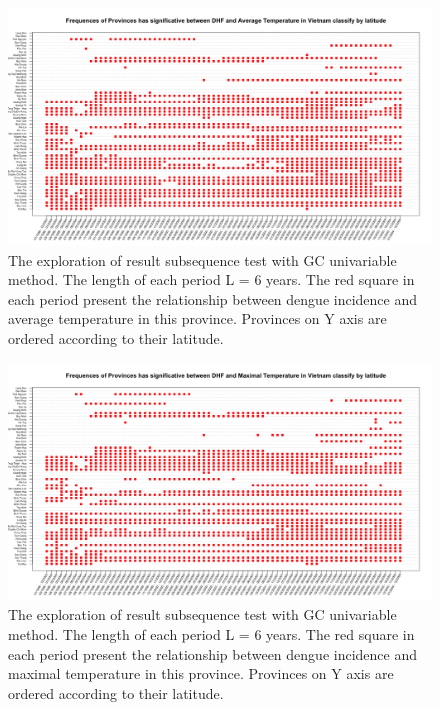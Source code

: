 

\begin{figure}[h]
\begin{center}
\includegraphics[width = \linewidth]{../figures/annexe/lat_result_ta.png}
\caption{The exploration of result subsequence test with GC univariable method. The length of each period L = 6 years. The red square in each period present the relationship between dengue incidence and average temperature in this province. Provinces on Y axis are ordered according to their latitude.  }
\label{expl_8}	
\end{center}
\end{figure}

\begin{figure}[h]
\begin{center}
\includegraphics[width = \linewidth]{../figures/annexe/lat_result_tx.png}
\caption{The exploration of result subsequence test with GC univariable method. The length of each period L = 6 years. The red square in each period present the relationship between dengue incidence and maximal temperature in this province. Provinces on Y axis are ordered according to their latitude.  }
\label{expl_9}	
\end{center}
\end{figure}

